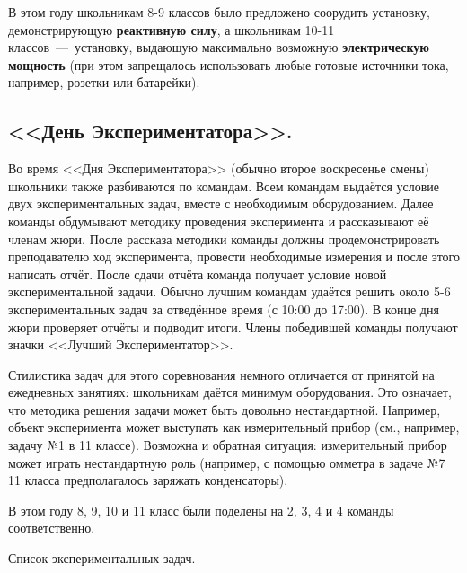\documentclass[12pt,a4paper,oneside,draft]{scrartcl}
\begin{document}
В этом году школьникам 8-9 классов было предложено соорудить
установку, демонстрирующую \textbf{реактивную силу}, а школьникам
10-11 классов~---~установку, выдающую максимально возможную
\textbf{электрическую мощность} (при этом запрещалось использовать
любые готовые источники тока, например, розетки или батарейки). 

\subsection{<<День Экспериментатора>>.}
\label{sec:day_exp}

Во время <<Дня Экспериментатора>> (обычно второе воскресенье смены)
школьники также разбиваются по командам. Всем командам выдаётся
условие двух экспериментальных задач, вместе с необходимым
оборудованием. Далее команды обдумывают методику проведения
эксперимента и рассказывают её членам жюри. После рассказа методики
команды должны продемонстрировать преподавателю ход эксперимента,
провести необходимые измерения и после этого написать отчёт. После
сдачи отчёта команда получает условие новой экспериментальной
задачи. Обычно лучшим командам удаётся решить около 5-6
экспериментальных задач за отведённое время (с 10:00 до 17:00). В
конце дня жюри проверяет отчёты и подводит итоги. Члены победившей
команды получают значки <<Лучший Экспериментатор>>.

Стилистика задач для этого соревнования немного отличается от принятой
на ежедневных занятиях: школьникам даётся минимум оборудования. Это
означает, что методика решения задачи может быть довольно
нестандартной. Например, объект эксперимента может выступать как
измерительный прибор (см., например, задачу №1 в 11 классе). Возможна
и обратная ситуация: измерительный прибор может играть нестандартную
роль (например, с помощью омметра в задаче №7 11 класса
предполагалось заряжать конденсаторы). 

В этом году 8, 9, 10 и 11 класс были поделены на 2, 3, 4 и 4 команды
соответственно. 

\begin{center}
  \textsf{Список экспериментальных задач.}
\end{center}
\end{document}
